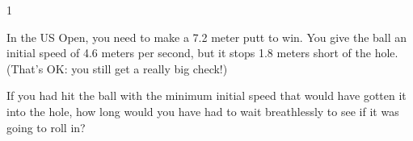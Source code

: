 
\AddToShipoutPicture*{\BackgroundPic}

\addtocounter {ProbNum} {1}

 
{\bf \Large{}} In the US Open, you need to make a 7.2 meter putt to win.  You give the ball an initial speed of 4.6 meters per second, but it stops 1.8 meters short of the hole.  (That's OK: you still get a really big check!) \bigskip

If you had hit the ball with the minimum initial speed that would have gotten it into the hole, how long would you have had to wait breathlessly to see if it was going to roll in?
\vfill




\newpage